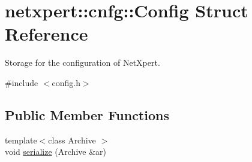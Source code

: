 \hypertarget{structnetxpert_1_1cnfg_1_1Config}{}\section{netxpert\+:\+:cnfg\+:\+:Config Struct Reference}
\label{structnetxpert_1_1cnfg_1_1Config}


Storage for the configuration of Net\+Xpert.  




{\ttfamily \#include $<$config.\+h$>$}

\subsection*{Public Member Functions}
\begin{DoxyCompactItemize}
\item 
{\footnotesize template$<$class Archive $>$ }\\void \hyperlink{structnetxpert_1_1cnfg_1_1Config_a69a9e3cd168b240c34cfb544c614ebbc}{serialize} (Archive \&ar)
\end{DoxyCompactItemize}
